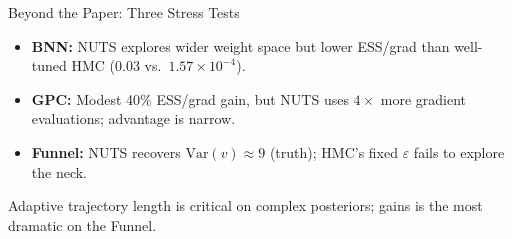 \documentclass{beamer}
\begin{document}
\begin{frame}{Beyond the Paper: Three Stress Tests}
\begin{center}
\begin{tikzpicture}[>=Stealth, font=\footnotesize]
  \end{tikzpicture}
  \end{center}

  \vspace{-0.5cm}
  \begin{tcolorbox}[warnbox, title=Results]
    \footnotesize
    \begin{itemize}\setlength\itemsep{2pt}
      \item \textbf{BNN:} NUTS explores wider weight space but lower ESS/grad than well-tuned HMC ($0.03$ vs.\ $1.57\!\times\!10^{-4}$).
      \item \textbf{GPC:} Modest 40\% ESS/grad gain, but NUTS uses $4\times$ more gradient evaluations; advantage is narrow.
      \item \textbf{Funnel:} NUTS recovers $\mathrm{Var}(v)\!\approx\!9$ (truth); HMC's fixed $\varepsilon$ fails to explore the neck.
    \end{itemize}
  \end{tcolorbox}

  \vspace{-0.1cm}
  {\footnotesize Adaptive trajectory length is critical on complex posteriors; gains is the most dramatic on the Funnel.}
\end{frame}

\end{document}
